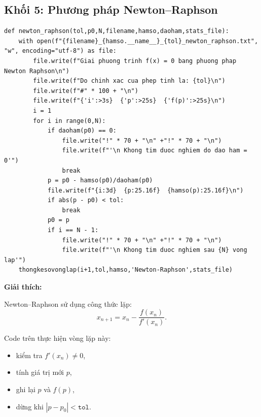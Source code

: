 \documentclass{article}
\begin{document}
\subsection{Khối 5: Phương pháp Newton--Raphson}
\begin{lstlisting}[style=mypython,caption={Phương pháp Newton--Raphson}]
def newton_raphson(tol,p0,N,filename,hamso,daoham,stats_file):
    with open(f"{filename}_{hamso.__name__}_{tol}_newton_raphson.txt", "w", encoding="utf-8") as file:
        file.write(f"Giai phuong trinh f(x) = 0 bang phuong phap Newton Raphson\n")
        file.write(f"Do chinh xac cua phep tinh la: {tol}\n")
        file.write(f"#" * 100 + "\n")
        file.write(f"{'i':>3s}  {'p':>25s}  {'f(p)':>25s}\n")
        i = 1
        for i in range(0,N):
            if daoham(p0) == 0:
                file.write("!" * 70 + "\n" +"!" * 70 + "\n")
                file.write(f"'\n Khong tim duoc nghiem do dao ham = 0'")
                break
            p = p0 - hamso(p0)/daoham(p0)
            file.write(f"{i:3d}  {p:25.16f}  {hamso(p):25.16f}\n")
            if abs(p - p0) < tol:
                break
            p0 = p
            if i == N - 1:
                file.write("!" * 70 + "\n" +"!" * 70 + "\n")
                file.write(f"'\n Khong tim duoc nghiem sau {N} vong lap'")
    thongkesovonglap(i+1,tol,hamso,'Newton-Raphson',stats_file)
\end{lstlisting}

\textbf{Giải thích:}

Newton--Raphson sử dụng công thức lặp:
\[
x_{n+1}=x_n-\frac{f(x_n)}{f'(x_n)}.
\]

Code trên thực hiện vòng lặp này:
\begin{itemize}
    \item kiểm tra \(f'(x_n)\neq 0\),
    \item tính giá trị mới \(p\),
    \item ghi lại \(p\) và \(f(p)\),
    \item dừng khi \(|p-p_0|<\texttt{tol}\).
\end{itemize}

\end{document}
